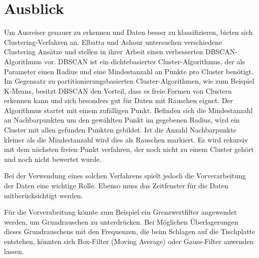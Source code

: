 \section{Ausblick}

Um Ausreiser genauer zu erkennen und Daten besser zu klassifizieren, bieten sich Clustering-Verfahren an.
Elbatta und Ashour untersuchen verschiedene Clustering Ansätze und stellen in ihrer Arbeit \cite{Elbatta2013ADM} einen verbesserten DBSCAN-Algorithmus vor.
DBSCAN ist ein  dichtebasierter Cluster-Algorithmus, der als Parameter einen Radius und eine Mindestanzahl an Punkte pro Cluster benötigt.
Im Gegensatz zu partitionierungsbasierten Cluster-Algorithmen, wie zum Beispiel K-Means, besitzt DBSCAN den Vorteil, dass es freie Formen von Clustern erkennen kann und sich besonders gut für Daten mit Rauschen eignet.
Der Algorithmus startet mit einem zufälligen Punkt.
Befinden sich die Mindestanzahl an Nachbarpunkten um den gewählten Punkt im gegebenen Radius, wird ein Cluster mit allen gefunden Punkten gebildet.
Ist die Anzahl Nachbarpunkte kleiner als die Mindestanzahl wird dies als Rauschen markiert.
Es wird rekursiv mit dem nächsten freien Punkt verfahren, der noch nicht zu einem Cluster gehört und noch nicht bewertet wurde.

Bei der Verwendung eines solchen Verfahrens spielt jedoch die Vorverarbeitung der Daten eine wichtige Rolle.
Ebenso muss das Zeitfenster für die Daten mitberücksichtigt werden.

Für die Vorverabeitung könnte zum Beispiel ein Grenzwertfilter angewendet werden, um Grundrauschen zu unterdrücken.
Bei Möglichen Überlagerungen dieses Grundrauschens mit den Frequenzen, die beim Schlagen auf die Tischplatte entstehen, könnten sich Box-Filter (Moving Average) oder Gauss-Filter anwenden lassen.


